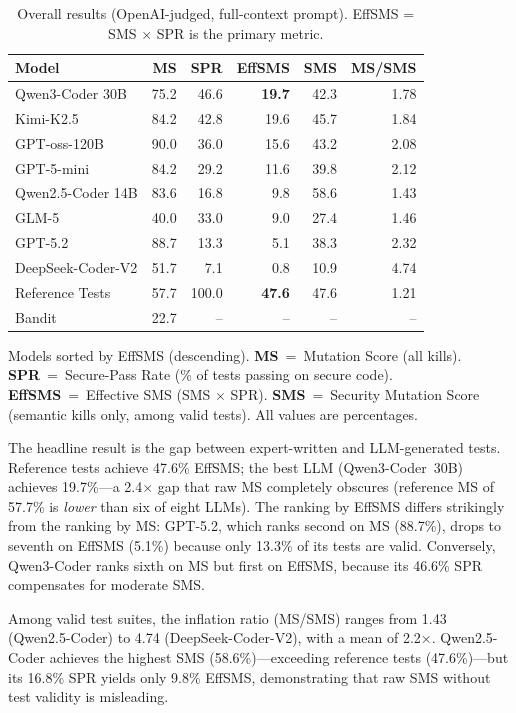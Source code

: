 \documentclass[sigconf,anonymous,review]{acmart}
\begin{document}
\begin{table}[t]
\caption{Overall results (OpenAI-judged, full-context prompt). EffSMS = SMS $\times$ SPR is the primary metric.}
\label{tab:rq1}
\small

\begin{tabular}{lrrrrr}
\toprule
\textbf{Model} & \textbf{MS} & \textbf{SPR} & \textbf{EffSMS} & \textbf{SMS} & \textbf{MS/SMS} \\
\midrule
Qwen3-Coder 30B & 75.2 & 46.6 & \textbf{19.7} & 42.3 & 1.78 \\
Kimi-K2.5 & 84.2 & 42.8 & 19.6 & 45.7 & 1.84 \\
GPT-oss-120B & 90.0 & 36.0 & 15.6 & 43.2 & 2.08 \\
GPT-5-mini & 84.2 & 29.2 & 11.6 & 39.8 & 2.12 \\
Qwen2.5-Coder 14B & 83.6 & 16.8 & 9.8 & 58.6 & 1.43 \\
GLM-5 & 40.0 & 33.0 & 9.0 & 27.4 & 1.46 \\
GPT-5.2 & 88.7 & 13.3 & 5.1 & 38.3 & 2.32 \\
DeepSeek-Coder-V2 & 51.7 & 7.1 & 0.8 & 10.9 & 4.74 \\
\midrule
Reference Tests & 57.7 & 100.0 & \textbf{47.6} & 47.6 & 1.21 \\
Bandit & 22.7 & -- & -- & -- & -- \\
\bottomrule
\end{tabular}

\vspace{2pt}
{\footnotesize Models sorted by EffSMS (descending). \textbf{MS}~=~Mutation Score (all kills). \textbf{SPR}~=~Secure-Pass Rate (\% of tests passing on secure code). \textbf{EffSMS}~=~Effective SMS (SMS $\times$ SPR). \textbf{SMS}~=~Security Mutation Score (semantic kills only, among valid tests). All values are percentages.}
\end{table}


The headline result is the gap between expert-written and LLM-generated tests. Reference tests achieve 47.6\% EffSMS; the best LLM (Qwen3-Coder~30B) achieves 19.7\%---a 2.4$\times$ gap that raw MS completely obscures (reference MS of 57.7\% is \emph{lower} than six of eight LLMs). The ranking by EffSMS differs strikingly from the ranking by MS: GPT-5.2, which ranks second on MS (88.7\%), drops to seventh on EffSMS (5.1\%) because only 13.3\% of its tests are valid. Conversely, Qwen3-Coder ranks sixth on MS but first on EffSMS, because its 46.6\% SPR compensates for moderate SMS.

Among valid test suites, the inflation ratio (MS/SMS) ranges from 1.43 (Qwen2.5-Coder) to 4.74 (DeepSeek-Coder-V2), with a mean of 2.2$\times$. Qwen2.5-Coder achieves the highest SMS (58.6\%)---exceeding reference tests (47.6\%)---but its 16.8\% SPR yields only 9.8\% EffSMS, demonstrating that raw SMS without test validity is misleading.
\end{document}
